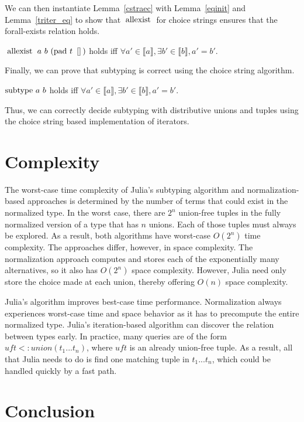 \documentclass[a4paper,english]{lipics-v2019}
\newcommand{\denotes}[1]{\llbracket #1 \rrbracket}
\renewcommand{\c}[1]{\ensuremath{\text{\lstinline{#1}}}\xspace}
\begin{document}
\noindent We can then instantiate Lemma~\ref{cstraec} with
Lemma~\ref{eqinit} and Lemma~\ref{triter_eq} to show that \c{allexist} for
choice strings ensures that the forall-exists relation holds.
 
\begin{theorem}
$\c{allexist}~a~b~(\c{pad}~t~\c{[]})$
 holds iff $\forall a'\in\denotes{a},\exists b'\in\denotes{b}, a'=b'$.
\end{theorem}

\noindent Finally, we can prove that subtyping is correct using the choice
string algorithm.

\begin{theorem}
$\c{subtype}~a~b$ holds iff $\forall a'\in\denotes{a}, \exists
  b'\in\denotes{b}, a'=b'$.
\end{theorem}

\noindent
Thus, we can correctly decide subtyping with distributive unions and tuples
using the choice string based implementation of iterators.

\section{Complexity}

The worst-case time complexity of Julia's subtyping algorithm and
normalization-based approaches is determined by the number of terms that
could exist in the normalized type. In the worst case, there are $2^n$
union-free tuples in the fully normalized version of a type that has $n$
unions.  Each of those tuples must always be explored. As a result, both
algorithms have worst-case $O(2^n)$ time complexity. The approaches differ,
however, in space complexity. The normalization approach computes and stores
each of the exponentially many alternatives, so it also has $O(2^n)$ space
complexity. However, Julia need only store the choice made at each union,
thereby offering $O(n)$ space complexity.

Julia's algorithm improves best-case time performance.  Normalization always
experiences worst-case time and space behavior as it has to precompute the
entire normalized type. Julia's iteration-based algorithm can discover the
relation between types early. In practice, many queries are of the form
$\mathit{uft} <: union(t_1...t_n)$, where $\mathit{uft}$ is an already
union-free tuple. As a result, all that Julia needs to do is find one matching
tuple in $t_1 ... t_n$, which could be handled quickly by a fast path.

\section{Conclusion}
\end{document}
